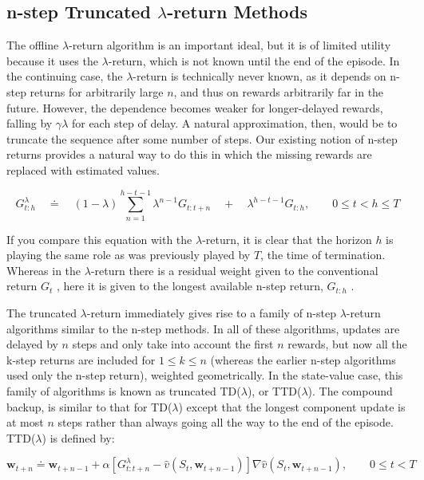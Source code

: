 \documentclass{article}
\begin{document}
\subsection{n-step Truncated \texorpdfstring{$\lambda$}{lambda}-return Methods}

The offline $\lambda$-return algorithm is an important ideal, but it is of limited utility because it uses the $\lambda$-return, which is not known until the end of the episode. In the continuing case, the $\lambda$-return is technically never known, 
as it depends on n-step returns for arbitrarily large $n$, and thus on rewards arbitrarily far in the future. However, the dependence becomes weaker for longer-delayed rewards, falling by $\gamma \lambda$ for each step of delay. A natural approximation, 
then, would be to truncate the sequence after some number of steps. Our existing notion of n-step returns provides a natural way to do this in which the missing rewards are replaced with estimated values.

$$
G _ { t : h } ^ { \lambda } \quad \doteq \quad ( 1 - \lambda ) \sum _ { n = 1 } ^ { h - t - 1 } \lambda ^ { n - 1 } G _ { t : t + n } \quad + \quad \lambda ^ { h - t - 1 } G _ { t : h } , \qquad 0 \leq t < h \leq T
$$

If you compare this equation with the $\lambda$-return, it is clear that the horizon $h$ is playing the same role as was previously played by $T$, the time of termination. Whereas in the $\lambda$-return there is a residual weight given to the conventional return $G _ { t }$ , 
here it is given to the longest available n-step return, $G _ { t : h }$ .

The truncated $\lambda$-return immediately gives rise to a family of n-step $\lambda$-return algorithms similar to the n-step methods. In all of these algorithms, updates are delayed by $n$ steps and only take into account the first $n$ rewards, but now all the k-step returns are included for $1 \leq k \leq n$ 
(whereas the earlier n-step algorithms used only the n-step return), weighted geometrically. In the state-value case, this family of algorithms is known as truncated TD($\lambda$), or TTD($\lambda$). The compound backup, is similar to that for TD($\lambda$) except that the longest component update is at most $n$ steps 
rather than always going all the way to the end of the episode. TTD($\lambda$) is defined by:

$$
\mathbf { w } _ { t + n } \doteq \mathbf { w } _ { t + n - 1 } + \alpha \left[ G _ { t : t + n } ^ { \lambda } - \hat { v } ( S _ { t } \mathbf { , } \mathbf { w } _ { t + n - 1 } ) \right] \nabla \hat { v } ( S _ { t } \mathbf { , } \mathbf { w } _ { t + n - 1 } ) , \qquad 0 \leq t < T
$$
\end{document}
